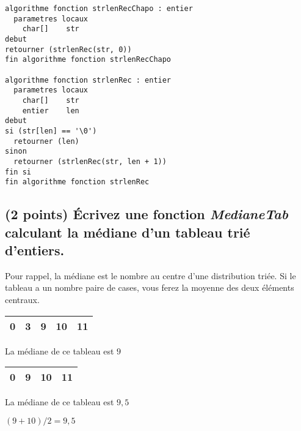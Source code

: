 \documentclass[11pt,a4paper]{article}
\begin{document}
\begin{center}

\begin{lstlisting}[style=algorithmique]
algorithme fonction strlenRecChapo : entier
  parametres locaux
    char[]    str
debut
retourner (strlenRec(str, 0))
fin algorithme fonction strlenRecChapo

algorithme fonction strlenRec : entier
  parametres locaux
    char[]    str
    entier    len
debut
si (str[len] == '\0')
  retourner (len)
sinon
  retourner (strlenRec(str, len + 1))
fin si
fin algorithme fonction strlenRec \end{lstlisting}

\end{center}


\newpage

\vfillFirst

\subsection{(2 points) \'Ecrivez une fonction \og \textit{MedianeTab} \fg{} calculant la médiane d'un tableau trié d'entiers. }


Pour rappel, la médiane est le nombre au centre d'une distribution triée. Si le tableau a un nombre paire de cases, vous ferez la moyenne des deux éléments centraux.


\begin{table}[h!]
  \centering
  \begin{minipage}{0.4\textwidth}
    \centering
    \begin{tabular}{| c | c | c | c | c |}
      \hline
      0 & 3 & 9 & 10 & 11 \\
      \hline
    \end{tabular}

  \smallskip

  La médiane de ce tableau est $ 9 $
  \end{minipage}
    \hfillx
    \begin{minipage}{0.4\textwidth}
    \centering
    \begin{tabular}{| c | c | c | c |}
      \hline
      0 & 9 & 10 & 11 \\
      \hline
    \end{tabular}

  \smallskip

  La médiane de ce tableau est $ 9,5 $

  $ (9 + 10) / 2 = 9,5 $
  \end{minipage}
\end{table}
\end{document}
